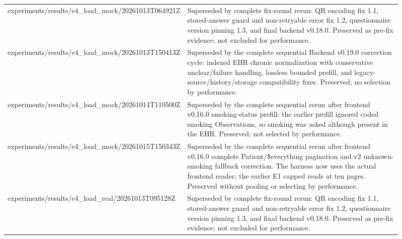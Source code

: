 \begin{longtable}{>{\raggedright\arraybackslash}p{0.31\linewidth}>{\raggedright\arraybackslash}p{0.6\linewidth}}
experiments/\allowbreak{}results/\allowbreak{}e4\_\allowbreak{}load\_\allowbreak{}mock/\allowbreak{}20261013T064921Z & Superseded by complete fix-\allowbreak{}round rerun:\allowbreak{} QR encoding fix 1.\allowbreak{}1, stored-\allowbreak{}answer guard and non-\allowbreak{}retryable error fix 1.\allowbreak{}2, questionnaire version pinning 1.\allowbreak{}3, and final backend v0.\allowbreak{}18.\allowbreak{}0.\allowbreak{} Preserved as pre-\allowbreak{}fix evidence; not excluded for performance.\allowbreak{} \\
experiments/\allowbreak{}results/\allowbreak{}e4\_\allowbreak{}load\_\allowbreak{}mock/\allowbreak{}20261013T150413Z & Superseded by the complete sequential Backend v0.\allowbreak{}19.\allowbreak{}0 correction cycle:\allowbreak{} indexed EHR chronic normalization with conservative unclear/\allowbreak{}failure handling, lossless bounded prefill, and legacy-\allowbreak{}source/\allowbreak{}history/\allowbreak{}storage compatibility fixes.\allowbreak{} Preserved; no selection by performance.\allowbreak{} \\
experiments/\allowbreak{}results/\allowbreak{}e4\_\allowbreak{}load\_\allowbreak{}mock/\allowbreak{}20261014T110500Z & Superseded by the complete sequential rerun after frontend v0.\allowbreak{}16.\allowbreak{}0 smoking-\allowbreak{}status prefill:\allowbreak{} the earlier prefill ignored coded smoking Observations, so smoking was asked although present in the EHR.\allowbreak{} Preserved; not selected by performance.\allowbreak{} \\
experiments/\allowbreak{}results/\allowbreak{}e4\_\allowbreak{}load\_\allowbreak{}mock/\allowbreak{}20261015T150343Z & Superseded by the complete sequential rerun after frontend v0.\allowbreak{}16.\allowbreak{}0 complete Patient/\allowbreak{}\$everything pagination and v2 unknown-\allowbreak{}smoking fallback correction.\allowbreak{} The harness now uses the actual frontend reader; the earlier E1 capped reads at ten pages.\allowbreak{} Preserved without pooling or selecting by performance.\allowbreak{} \\
experiments/\allowbreak{}results/\allowbreak{}e4\_\allowbreak{}load\_\allowbreak{}real/\allowbreak{}20261013T095128Z & Superseded by complete fix-\allowbreak{}round rerun:\allowbreak{} QR encoding fix 1.\allowbreak{}1, stored-\allowbreak{}answer guard and non-\allowbreak{}retryable error fix 1.\allowbreak{}2, questionnaire version pinning 1.\allowbreak{}3, and final backend v0.\allowbreak{}18.\allowbreak{}0.\allowbreak{} Preserved as pre-\allowbreak{}fix evidence; not excluded for performance.\allowbreak{} \\

\end{longtable}
